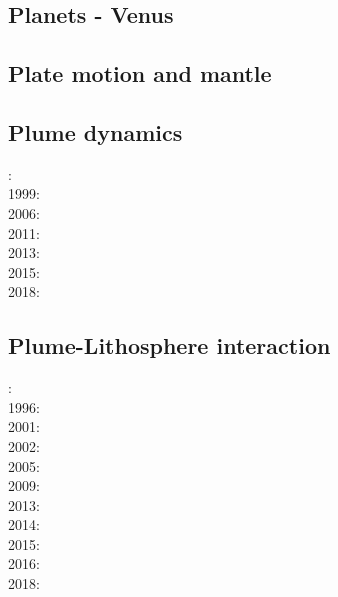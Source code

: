 \cite{zhdv19}

\subsection*{Planets - Venus}

\cite{scbg90}
\cite{kiha92}
\cite{somo96}
\cite{mazk98}\cite{moso98}
\cite{vavv05}
\cite{arta12}
\cite{cram17}\cite{dast17}
\cite{king18}



\subsection*{Plate motion and mantle}

\noindent
\cite{zieg92a}
\cite{zhgm98}
\cite{lizh09}
\cite{huss12}
\cite{mosq13}
\cite{yoha15}
\cite{tewg19}

\subsection*{Plume dynamics}

: \cite{nasf94}\cite{hayu94}\\
1999: \cite{lays99}\\
2006: \cite{isst06}\\
2011: \cite{toyu11}\cite{talz11}\cite{burk11}\cite{memm11}\\
2013: \cite{dagm13}\cite{madd13}\\
2015: \cite{daso15}\cite{hafg15}\\
2018: \cite{dacc18}

\subsection*{Plume-Lithosphere interaction}

: \cite{rich94}\\
1996: \cite{zhgm96}\\
2001: \cite{vapy01}\\
2002: \cite{foul02}\\
2005: \cite{bugu05}\\
2009: \cite{bucl09}\\
2013: \cite{bemm13}\cite{brps13}\\
2014: \cite{buge14}\\
2015: \cite{gesb15}\cite{kocb15}\cite{meds15}\\
2016: \cite{fige16}\cite{gadb16}\\
2018: \cite{daga18}

